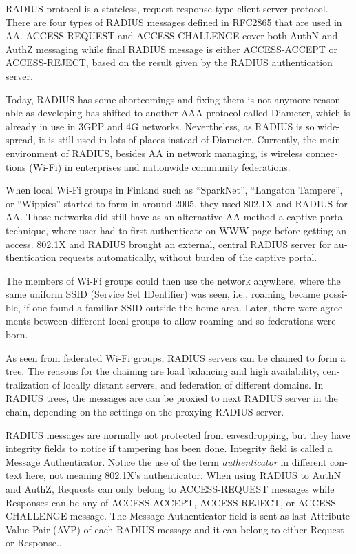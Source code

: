 \documentclass[12pt,a4paper,english]{tutthesis}
\begin{document}
\begin{otherlanguage}{english}
RADIUS protocol is a stateless, request-response type client-server
protocol. 
There are four types of RADIUS messages defined in RFC2865 that are
used in AA. ACCESS-REQUEST and ACCESS-CHALLENGE cover both AuthN and
AuthZ messaging while final RADIUS message is either
ACCESS-ACCEPT or ACCESS-REJECT, based on the
result given by the RADIUS authentication server.

Today, RADIUS has some shortcomings and fixing them is not anymore
reasonable as developing has shifted to another AAA protocol called
Diameter, which is already in use in 3GPP and 4G
networks\cite{diameter}.  Nevertheless, as RADIUS is so wide-spread,
it is still used in lots of places instead of Diameter.  Currently,
the main environment of RADIUS, besides AA in network managing, is wireless
connections (Wi-Fi) in enterprises and nationwide community
federations.


When local Wi-Fi groups in Finland such as ``SparkNet'', ``Langaton
Tampere'', or ``Wippies'' started to form in around 2005, they used
802.1X and RADIUS for AA. Those networks did still have as an
alternative AA method a captive portal technique, where user had to
first authenticate on WWW-page before getting an access.  802.1X and
RADIUS brought an external, central RADIUS server for authentication
requests automatically, without burden of the captive portal.

The members of Wi-Fi groups could then use the network anywhere, where
the same uniform SSID (Service Set IDentifier) was seen, i.e., roaming
became possible, if one found a familiar SSID outside the home area.
Later, there were agreements between different local groups to allow
roaming and so federations were born.

As seen from federated Wi-Fi groups, RADIUS servers can be chained to
form a tree. The reasons for the chaining are load balancing and high
availability, centralization of locally distant servers, and
federation of different domains. In RADIUS trees, the messages are
can be proxied to next RADIUS server in the chain, depending on the settings
on the proxying RADIUS server.

RADIUS messages are normally not protected from eavesdropping, but they have
integrity fields to notice if tampering has been done. 
Integrity field is called a Message Authenticator.
Notice the use of the term \emph{authenticator} in different context here, not
meaning 802.1X's authenticator.
When using RADIUS to AuthN and AuthZ, Requests can only belong to ACCESS-REQUEST messages while
Responses can be any of ACCESS-ACCEPT, ACCESS-REJECT, or ACCESS-CHALLENGE message.
The Message Authenticator field is sent as last Attribute Value Pair (AVP)
of each RADIUS message and it can belong 
to either Request or Response.\cite[p.20]{radiusbook}.


\end{otherlanguage}
\end{document}
